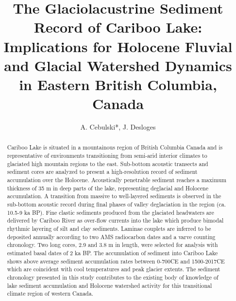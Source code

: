 \documentclass[Royal,times,doublespace,sageh]{sagej}
\begin{document}

\title{The Glaciolacustrine Sediment Record of Cariboo Lake:
Implications for Holocene Fluvial and Glacial Watershed Dynamics in
Eastern British Columbia, Canada}


\author{A. Cebulski*, J. Desloges}




\begin{abstract}
Cariboo Lake is situated in a mountainous region of British Columbia
Canada and is representative of environments transitioning from
semi-arid interior climates to glaciated high mountain regions to the
east. Sub-bottom acoustic transects and sediment cores are analyzed to
present a high-resolution record of sediment accumulation over the
Holocene. Acoustically penetrable sediment reaches a maximum thickness
of 35 m in deep parts of the lake, representing deglacial and Holocene
accumulation. A transition from massive to well-layered sediments is
observed in the sub-bottom acoustic record during final phases of valley
deglaciation in the region (ca. 10.5-9 ka BP). Fine clastic sediments
produced from the glaciated headwaters are delivered by Cariboo River as
over-flow currents into the lake which produce bimodal rhythmic layering
of silt and clay sediments. Laminae couplets are inferred to be
deposited annually according to two AMS radiocarbon dates and a varve
counting chronology. Two long cores, 2.9 and 3.8 m in length, were
selected for analysis with estimated basal dates of 2 ka BP. The
accumulation of sediment into Cariboo Lake shows above average sediment
accumulation rates between 0-700CE and 1500-2017CE which are coincident
with cool temperatures and peak glacier extents. The sediment chronology
presented in this study contributes to the existing body of knowledge of
lake sediment accumulation and Holocene watershed activity for this
transitional climate region of western Canada.
\end{abstract}
\end{document}
